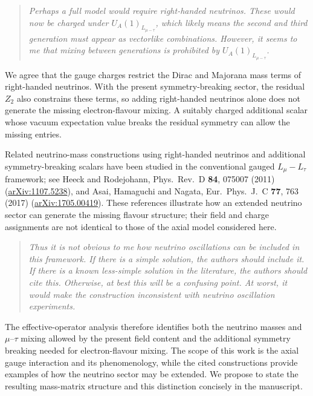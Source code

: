 \documentclass[12pt,a4paper]{article}
\begin{document}
\medskip
{}

\begin{quote}\itshape
Perhaps a full model would require right-handed neutrinos. These would now be charged under \(U_A(1)_{L_{\mu-\tau}}\), which likely means the second and third generation must appear as vectorlike combinations. However, it seems to me that mixing between generations is prohibited by \(U_A(1)_{L_{\mu-\tau}}\).
\end{quote}


We agree that the gauge charges restrict the Dirac and Majorana mass terms of right-handed neutrinos. With the present symmetry-breaking sector, the residual \(Z_2\) also constrains these terms, so adding right-handed neutrinos alone does not generate the missing electron-flavour mixing. A suitably charged additional scalar whose vacuum expectation value breaks the residual symmetry can allow the missing entries.

Related neutrino-mass constructions using right-handed neutrinos and additional symmetry-breaking scalars have been studied in the conventional gauged \(L_\mu-L_\tau\) framework; see Heeck and Rodejohann, Phys.\ Rev.\ D \textbf{84}, 075007 (2011) (\href{https://arxiv.org/abs/1107.5238}{arXiv:1107.5238}), and Asai, Hamaguchi and Nagata, Eur.\ Phys.\ J.\ C \textbf{77}, 763 (2017) (\href{https://arxiv.org/abs/1705.00419}{arXiv:1705.00419}). These references illustrate how an extended neutrino sector can generate the missing flavour structure; their field and charge assignments are not identical to those of the axial model considered here.

\medskip
{}

\begin{quote}\itshape
Thus it is not obvious to me how neutrino oscillations can be included in this framework. If there is a simple solution, the authors should include it. If there is a known less-simple solution in the literature, the authors should cite this. Otherwise, at best this will be a confusing point. At worst, it would make the construction inconsistent with neutrino oscillation experiments.
\end{quote}


The effective-operator analysis therefore identifies both the neutrino masses and \(\mu\)--\(\tau\) mixing allowed by the present field content and the additional symmetry breaking needed for electron-flavour mixing. The scope of this work is the axial gauge interaction and its phenomenology, while the cited constructions provide examples of how the neutrino sector may be extended. We propose to state the resulting mass-matrix structure and this distinction concisely in the manuscript.
\end{document}
